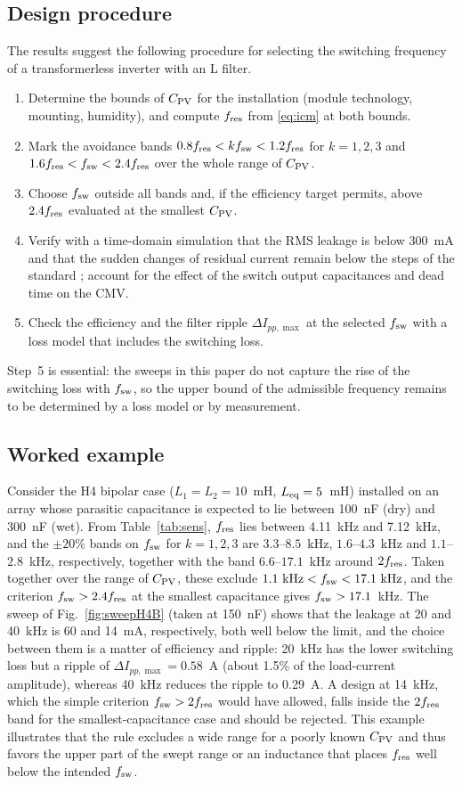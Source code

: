 \subsection{Design procedure}
The results suggest the following procedure for selecting the switching frequency of a transformerless inverter with an L filter.
\begin{enumerate}
  \item Determine the bounds of $C_{\mathrm{PV}}$ for the installation (module technology, mounting, humidity), and compute $f_{\mathrm{res}}$ from \eqref{eq:icm} at both bounds.
  \item Mark the avoidance bands $0.8f_{\mathrm{res}}<kf_{\mathrm{sw}}<1.2f_{\mathrm{res}}$ for $k=1,2,3$ and $1.6f_{\mathrm{res}}<f_{\mathrm{sw}}<2.4f_{\mathrm{res}}$ over the whole range of $C_{\mathrm{PV}}$.
  \item Choose $f_{\mathrm{sw}}$ outside all bands and, if the efficiency target permits, above $2.4f_{\mathrm{res}}$ evaluated at the smallest $C_{\mathrm{PV}}$.
  \item Verify with a time-domain simulation that the RMS leakage is below 300~mA and that the sudden changes of residual current remain below the steps of the standard \cite{IEC62109}; account for the effect of the switch output capacitances and dead time on the CMV.
  \item Check the efficiency and the filter ripple $\Delta I_{pp,\max}$ at the selected $f_{\mathrm{sw}}$ with a loss model that includes the switching loss.
\end{enumerate}
Step~5 is essential: the sweeps in this paper do not capture the rise of the switching loss with $f_{\mathrm{sw}}$, so the upper bound of the admissible frequency remains to be determined by a loss model or by measurement.

\subsection{Worked example}
Consider the H4 bipolar case ($L_1=L_2=10$~mH, $L_{\mathrm{eq}}=5$~mH) installed on an array whose parasitic capacitance is expected to lie between 100~nF (dry) and 300~nF (wet). From Table~\ref{tab:sens}, $f_{\mathrm{res}}$ lies between 4.11~kHz and 7.12~kHz, and the $\pm20\%$ bands on $f_{\mathrm{sw}}$ for $k=1,2,3$ are $3.3$--$8.5$~kHz, $1.6$--$4.3$~kHz and $1.1$--$2.8$~kHz, respectively,
together with the band $6.6$--$17.1$~kHz around $2f_{\mathrm{res}}$. Taken together over the range of $C_{\mathrm{PV}}$, these exclude $1.1~\text{kHz}<f_{\mathrm{sw}}<17.1~\text{kHz}$, and the criterion $f_{\mathrm{sw}}>2.4f_{\mathrm{res}}$ at the smallest capacitance gives $f_{\mathrm{sw}}>17.1$~kHz. The sweep of Fig.~\ref{fig:sweepH4B} (taken at 150~nF) shows that the leakage at 20 and 40~kHz is 60 and 14~mA, respectively, both well below the limit, and the choice between them is a matter of efficiency and ripple: 20~kHz has the lower switching loss but a ripple of $\Delta I_{pp,\max}=0.58$~A (about 1.5\% of the load-current amplitude), whereas 40~kHz reduces the ripple to 0.29~A. A design at 14~kHz, which the simple criterion $f_{\mathrm{sw}}>2f_{\mathrm{res}}$ would have allowed, falls inside the $2f_{\mathrm{res}}$ band for the smallest-capacitance case and should be rejected. This example illustrates that the rule excludes a wide range for a poorly known $C_{\mathrm{PV}}$ and thus favors the upper part of the swept range or an inductance that places $f_{\mathrm{res}}$ well below the intended $f_{\mathrm{sw}}$.


